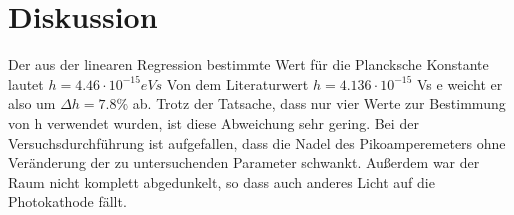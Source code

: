 \section{Diskussion}
\label{sec:Diskussion}

Der aus der linearen Regression bestimmte Wert für die Plancksche Konstante lautet
$h=4.46 \cdot 10^{-15} eVs$
Von dem Literaturwert $h = 4.136 \cdot 10^{-15}$ Vs e weicht er also um 
$\Delta h= 7.8\% $ ab. Trotz der Tatsache, dass nur vier Werte zur Bestimmung von 
h verwendet wurden, ist diese Abweichung sehr gering. 
Bei der Versuchsdurchführung ist aufgefallen, dass die Nadel des Pikoamperemeters 
ohne Veränderung der zu untersuchenden Parameter schwankt. Außerdem war der Raum nicht komplett 
abgedunkelt, so dass auch anderes Licht auf die Photokathode fällt.

